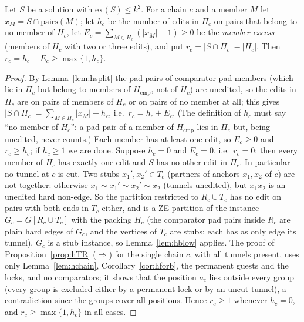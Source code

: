 \begin{lemma}\label{lem:hregion}
Let $S$ be a solution with $\mathrm{ex}(S)\le k^2$. For a chain $c$ and a member $M$ let $x_M=S\cap\mathrm{pairs}(M)$; let $h_c$ be the number of edits in $\Pi_c$ on pairs that belong to no member of $H_c$, let $E_c=\sum_{M\in H_c}(|x_M|-1)\ge0$ be the \emph{member excess} (members of $H_c$ with two or three edits), and put $r_c=|S\cap\Pi_c|-|H_c|$. Then $r_c=h_c+E_c\ge\max\{1,h_c\}$.
\end{lemma}
\begin{proof}
By Lemma~\ref{lem:hsplit} the pad pairs of comparator pad members (which lie in $\Pi_c$ but belong to members of $H_{\mathrm{cmp}}$, not of $H_c$) are unedited, so the edits in $\Pi_c$ are on pairs of members of $H_c$ or on pairs of no member at all; this gives $|S\cap\Pi_c|=\sum_{M\in H_c}|x_M|+h_c$, i.e.\ $r_c=h_c+E_c$. (The definition of $h_c$ must say ``no member of $H_c$'': a pad pair of a member of $H_{\mathrm{cmp}}$ lies in $\Pi_c$ but, being unedited, never counts.) Each member has at least one edit, so $E_c\ge0$ and $r_c\ge h_c$; if $h_c\ge1$ we are done. Suppose $h_c=0$ and $E_c=0$, i.e.\ $r_c=0$: then every member of $H_c$ has exactly one edit and $S$ has no other edit in $\Pi_c$. In particular no tunnel at $c$ is cut. Two stubs $x_1',x_2'\in T_c$ (partners of anchors $x_1,x_2$ of $c$) are not together: otherwise $x_1\sim x_1'\sim x_2'\sim x_2$ (tunnels unedited), but $x_1x_2$ is an unedited hard non-edge. So the partition restricted to $R_c\cup T_c$ has no edit on pairs with both ends in $T_c$ either, and is a ZE partition of the instance $G_c=G[R_c\cup T_c]$ with the packing $H_c$ (the comparator pad pairs inside $R_c$ are plain hard edges of $G_c$, and the vertices of $T_c$ are stubs: each has as only edge its tunnel). $G_c$ is a stub instance, so Lemma~\ref{lem:hblow} applies. The proof of Proposition~\ref{prop:hTR} ($\Rightarrow$) for the single chain $c$, with all tunnels present, uses only Lemma~\ref{lem:hchain}, Corollary~\ref{cor:hforb}, the permanent guests and the locks, and no comparators; it shows that the position $a_c$ lies outside every group (every group is excluded either by a permanent lock or by an uncut tunnel), a contradiction since the groups cover all positions. Hence $r_c\ge1$ whenever $h_c=0$, and $r_c\ge\max\{1,h_c\}$ in all cases.
\end{proof}

